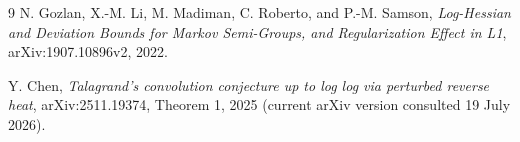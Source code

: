 \documentclass[10pt]{article}
\begin{document}
\begin{thebibliography}{9}
N. Gozlan, X.-M. Li, M. Madiman, C. Roberto, and P.-M. Samson,
\emph{Log-Hessian and Deviation Bounds for Markov Semi-Groups, and
Regularization Effect in L1}, arXiv:1907.10896v2, 2022.

Y. Chen,
\emph{Talagrand's convolution conjecture up to log log via perturbed reverse
heat}, arXiv:2511.19374, Theorem 1, 2025 (current arXiv version consulted
19 July 2026).
\end{thebibliography}
\end{document}
